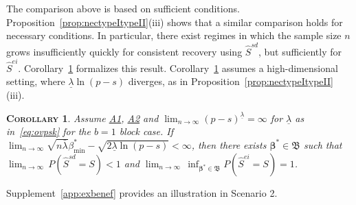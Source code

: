 \documentclass[
  12pt]{article}
\newcommand{\bbeta}{\boldsymbol{\beta}}
\newtheorem{cor}[thm]{\textsc{Corollary}}
\begin{document}
The comparison above is based on sufficient conditions.
Proposition~\ref{prop:nectypeItypeII}(iii) shows that a similar comparison holds for necessary conditions.
In particular, there exist regimes in which the sample size $n$ grows insufficiently quickly for consistent recovery using $\hat S^{sd}$, but sufficiently for $\hat S^{ei}$.
Corollary~\ref{cor:selconstimpossiblereg} formalizes this result.
Corollary~\ref{cor:selconstimpossiblereg} assumes a high-dimensional setting, where $\underline{\lambda} \ln(p-s)$ diverges, %
as in Proposition~\ref{prop:nectypeItypeII} (iii). 

\begin{cor}\label{cor:selconstimpossiblereg}
Assume \hyperlink{lab:A1}{A1}, \hyperlink{lab:A2}{A2} and $\lim_{n\to\infty}(p-s)^{\underline{\lambda}}=\infty$ for $\underline{\lambda}$ as in~\eqref{eq:ovpsk} for the $b=1$ block case. If
$\lim_{n\to\infty}\sqrt{n\bar{\lambda}}\beta_{\min}^*-\sqrt{2\underline{\lambda}\ln(p-s)}< \infty$,
then \color{green}there exists $\bbeta^*\in\mathfrak{B}$ such that \color{black}
$\lim_{n \to \infty} \, P(\hat{S}^{sd} = S) < 1$ and $\lim_{n \to \infty} \, \inf_{\bbeta^*\in\mathfrak{B}}P(\hat{S}^{ei} = S) = 1$.
\end{cor}
Supplement~\ref{app:exbenef} provides an illustration in Scenario 2.
\end{document}
